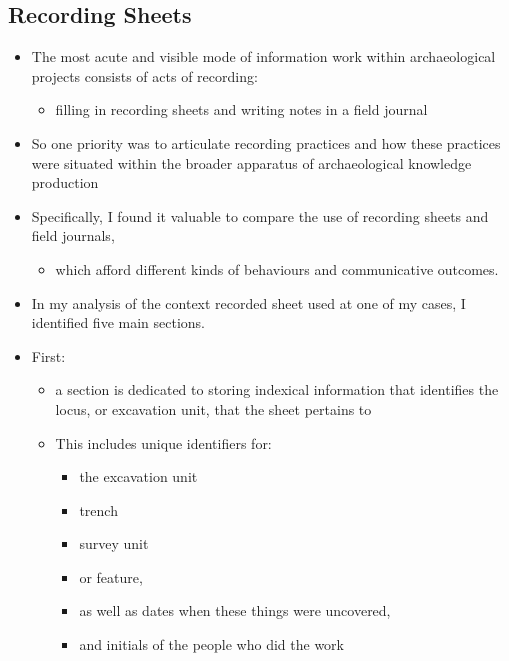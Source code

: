 \documentclass{article}
\begin{document}
\subsection{Recording Sheets}
\begin{itemize}
  \item The most acute and visible mode of information work within archaeological projects consists of acts of recording:
  \begin{itemize}
    \item filling in recording sheets and writing notes in a field journal
  \end{itemize}
  \item So one priority was to articulate recording practices and how these practices were situated within the broader apparatus of archaeological knowledge production
  \item Specifically, I found it valuable to compare the use of recording sheets and field journals,
  \begin{itemize}
    \item which afford different kinds of behaviours and communicative outcomes.
  \end{itemize}\vspace{1em}

  \item In my analysis of the context recorded sheet used at one of my cases, I identified five main sections.\\
  
  \item First:
  \begin{itemize}
    \item a section is dedicated to storing indexical information that identifies the locus, or excavation unit, that the sheet pertains to
    \item This includes unique identifiers for:
    \begin{itemize}
      \item the excavation unit
      \item trench
      \item survey unit
      \item or feature,
      \item as well as dates when these things were uncovered,
      \item and initials of the people who did the work
    \end{itemize}
  \end{itemize}\vspace{1em}


\end{itemize}
\end{document}
